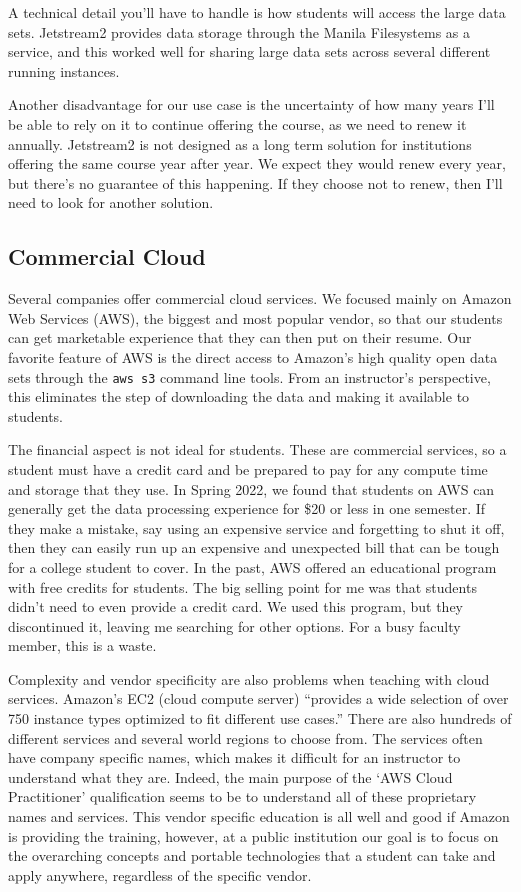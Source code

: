 \documentclass[12pt]{article}
\begin{document}
A technical detail you'll have to handle is how students will access the large data sets.
Jetstream2 provides data storage through the Manila Filesystems as a service, and this worked well for sharing large data sets across several different running instances.

Another disadvantage for our use case is the uncertainty of how many years I'll be able to rely on it to continue offering the course, as we need to renew it annually.
Jetstream2 is not designed as a long term solution for institutions offering the same course year after year. 
We expect they would renew every year, but there's no guarantee of this happening.
If they choose not to renew, then I'll need to look for another solution.

\subsection{Commercial Cloud}

Several companies offer commercial cloud services.
We focused mainly on Amazon Web Services (AWS), the biggest and most popular vendor, so that our students can get marketable experience that they can then put on their resume.
Our favorite feature of AWS is the direct access to Amazon's high quality open data sets through the \texttt{aws s3} command line tools.
From an instructor's perspective, this eliminates the step of downloading the data and making it available to students.

The financial aspect is not ideal for students.
These are commercial services, so a student must have a credit card and be prepared to pay for any compute time and storage that they use.
In Spring 2022, we found that students on AWS can generally get the data processing experience for \$20 or less in one semester.
If they make a mistake, say using an expensive service and forgetting to shut it off, then they can easily run up an expensive and unexpected bill that can be tough for a college student to cover.
In the past, AWS offered an educational program with free credits for students.
The big selling point for me was that students didn't need to even provide a credit card.
We used this program, but they discontinued it, leaving me searching for other options.
For a busy faculty member, this is a waste.

Complexity and vendor specificity are also problems when teaching with cloud services.
Amazon's EC2 (cloud compute server) ``provides a wide selection of over 750 instance types optimized to fit different use cases.''
There are also hundreds of different services and several world regions to choose from.
The services often have company specific names, which makes it difficult for an instructor to understand what they are.
Indeed, the main purpose of the `AWS Cloud Practitioner' qualification seems to be to understand all of these proprietary names and services.
This vendor specific education is all well and good if Amazon is providing the training, however, at a public institution our goal is to focus on the overarching concepts and portable technologies that a student can take and apply anywhere, regardless of the specific vendor.
\end{document}

